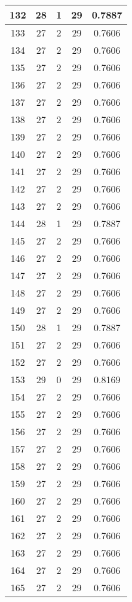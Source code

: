 \documentclass[letterpaper, 12pt]{article}
\begin{document}
\begin{longtable}{|c|c|c|c|c|}
\hline
132 & 28 & 1 & 29 & 0.7887 \\
\hline
133 & 27 & 2 & 29 & 0.7606 \\
\hline
134 & 27 & 2 & 29 & 0.7606 \\
\hline
135 & 27 & 2 & 29 & 0.7606 \\
\hline
136 & 27 & 2 & 29 & 0.7606 \\
\hline
137 & 27 & 2 & 29 & 0.7606 \\
\hline
138 & 27 & 2 & 29 & 0.7606 \\
\hline
139 & 27 & 2 & 29 & 0.7606 \\
\hline
140 & 27 & 2 & 29 & 0.7606 \\
\hline
141 & 27 & 2 & 29 & 0.7606 \\
\hline
142 & 27 & 2 & 29 & 0.7606 \\
\hline
143 & 27 & 2 & 29 & 0.7606 \\
\hline
144 & 28 & 1 & 29 & 0.7887 \\
\hline
145 & 27 & 2 & 29 & 0.7606 \\
\hline
146 & 27 & 2 & 29 & 0.7606 \\
\hline
147 & 27 & 2 & 29 & 0.7606 \\
\hline
148 & 27 & 2 & 29 & 0.7606 \\
\hline
149 & 27 & 2 & 29 & 0.7606 \\
\hline
150 & 28 & 1 & 29 & 0.7887 \\
\hline
151 & 27 & 2 & 29 & 0.7606 \\
\hline
152 & 27 & 2 & 29 & 0.7606 \\
\hline
153 & 29 & 0 & 29 & 0.8169 \\
\hline
154 & 27 & 2 & 29 & 0.7606 \\
\hline
155 & 27 & 2 & 29 & 0.7606 \\
\hline
156 & 27 & 2 & 29 & 0.7606 \\
\hline
157 & 27 & 2 & 29 & 0.7606 \\
\hline
158 & 27 & 2 & 29 & 0.7606 \\
\hline
159 & 27 & 2 & 29 & 0.7606 \\
\hline
160 & 27 & 2 & 29 & 0.7606 \\
\hline
161 & 27 & 2 & 29 & 0.7606 \\
\hline
162 & 27 & 2 & 29 & 0.7606 \\
\hline
163 & 27 & 2 & 29 & 0.7606 \\
\hline
164 & 27 & 2 & 29 & 0.7606 \\
\hline
165 & 27 & 2 & 29 & 0.7606 \\

\end{longtable}
\end{document}
